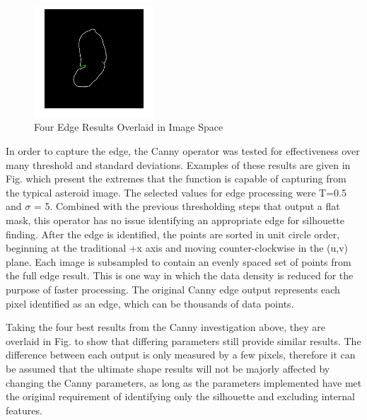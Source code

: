 \begin{figure}
    \centering
    \vspace{-10pt}
    \captionsetup{justification=centering}
    \includegraphics[width = 0.4\textwidth]{fig/overlay_canny_correctparameters.png}
    \caption{Four Edge Results Overlaid in Image Space}
    \label{fig:overlay}
\end{figure}
In order to capture the edge, the Canny operator was tested for effectiveness over many threshold and standard deviations. Examples of these results are given in Fig. %
which present the extremes that the function is capable of capturing from the typical asteroid image. The selected values for edge processing were T=0.5 and $\sigma$ = 5. Combined with the previous thresholding steps that output a flat mask, this operator has no issue identifying an appropriate edge for silhouette finding. After the edge is identified, the points are sorted in unit circle order, beginning at the traditional +x axis and moving counter-clockwise in the (u,v) plane. Each image is subsampled to contain an evenly spaced set of points from the full edge result. This is one way in which the data density is reduced for the purpose of faster processing. The original Canny edge output represents each pixel identified as an edge, which can be thousands of data points. 





Taking the four best results from the Canny investigation above, they are overlaid in Fig. %
to show that differing parameters still provide similar results. The difference between each output is only measured by a few pixels, therefore it can be assumed that the ultimate shape results will not be majorly affected by changing the Canny parameters, as long as the parameters implemented have met the original requirement of identifying only the silhouette and excluding internal features. 

